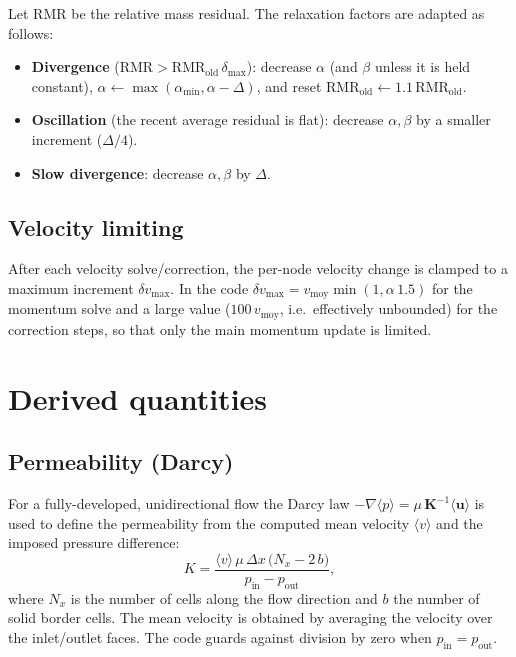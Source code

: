 \documentclass[11pt,a4paper]{article}
\newcommand{\vc}[1]{\mathbf{#1}}            %
\begin{document}
Let $\mathrm{RMR}$ be the relative mass residual.  The relaxation factors are
adapted as follows:
\begin{itemize}[leftmargin=1.5em]
\item \textbf{Divergence} ($\mathrm{RMR}>\mathrm{RMR}_{\text{old}}\,\delta_{\max}$):
  decrease $\alpha$ (and $\beta$ unless it is held constant),
  $\alpha\leftarrow\max(\alpha_{\min},\alpha-\Delta)$, and reset
  $\mathrm{RMR}_{\text{old}}\leftarrow 1.1\,\mathrm{RMR}_{\text{old}}$.
\item \textbf{Oscillation} (the recent average residual is flat): decrease
  $\alpha,\beta$ by a smaller increment ($\Delta/4$).
\item \textbf{Slow divergence}: decrease $\alpha,\beta$ by $\Delta$.
\end{itemize}

\subsection{Velocity limiting}

After each velocity solve/correction, the per-node velocity change is clamped
to a maximum increment $\delta v_{\max}$.  In the code
$\delta v_{\max}=v_{\text{moy}}\min(1,\alpha\,1.5)$ for the momentum solve and
a large value ($100\,v_{\text{moy}}$, i.e.\ effectively unbounded) for the
correction steps, so that only the main momentum update is limited.

\section{Derived quantities}

\subsection{Permeability (Darcy)}

For a fully-developed, unidirectional flow the Darcy law
$-\nabla\langle p\rangle=\mu\,\mathbf{K}^{-1}\langle\vc{u}\rangle$ is used to
define the permeability from the computed mean velocity $\langle v\rangle$ and
the imposed pressure difference:
\begin{equation}
K=\frac{\langle v\rangle\,\mu\,\Delta x\,\bigl(N_{x}-2\,b\bigr)}
        {p_{\text{in}}-p_{\text{out}}} ,
\end{equation}
where $N_{x}$ is the number of cells along the flow direction and $b$ the
number of solid border cells.  The mean velocity is obtained by averaging the
velocity over the inlet/outlet faces.  The code guards against division by
zero when $p_{\text{in}}=p_{\text{out}}$.
\end{document}
